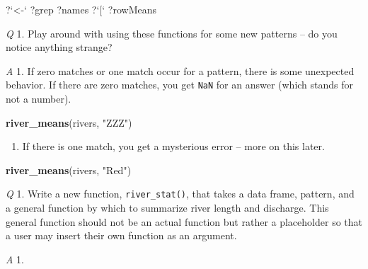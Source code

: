 \documentclass[
]{book}
\newenvironment{Shaded}{\begin{snugshade}}{\end{snugshade}}
\newcommand{\DataTypeTok}[1]{\textcolor[rgb]{0.13,0.29,0.53}{#1}}
\newcommand{\KeywordTok}[1]{\textcolor[rgb]{0.13,0.29,0.53}{\textbf{#1}}}
\newcommand{\NormalTok}[1]{#1}
\newcommand{\StringTok}[1]{\textcolor[rgb]{0.31,0.60,0.02}{#1}}
\providecommand{\tightlist}{%
  \setlength{\itemsep}{0pt}\setlength{\parskip}{0pt}}
\begin{document}
\begin{Shaded}
\begin{Highlighting}[]
\NormalTok{?}\StringTok{`}\DataTypeTok{<-}\StringTok{`}
\NormalTok{?grep}
\NormalTok{?names}
\NormalTok{?}\StringTok{`}\DataTypeTok{[}\StringTok{`}
\NormalTok{?rowMeans}
\end{Highlighting}
\end{Shaded}

\emph{Q} 1. Play around with using these functions for some new patterns -- do you notice anything strange?

\emph{A} 1. If zero matches or one match occur for a pattern, there is some unexpected behavior. If there are zero matches, you get \texttt{NaN} for an answer (which stands for not a number).

\begin{Shaded}
\begin{Highlighting}[]
\KeywordTok{river_means}\NormalTok{(rivers, }\StringTok{"ZZZ"}\NormalTok{)}
\end{Highlighting}
\end{Shaded}

\begin{enumerate}
\def\labelenumi{\arabic{enumi}.}
\setcounter{enumi}{1}
\tightlist
\item
  If there is one match, you get a mysterious error -- more on this later.
\end{enumerate}

\begin{Shaded}
\begin{Highlighting}[]
\KeywordTok{river_means}\NormalTok{(rivers, }\StringTok{"Red"}\NormalTok{)}
\end{Highlighting}
\end{Shaded}

\emph{Q} 1. Write a new function, \texttt{river\_stat()}, that takes a data frame, pattern, and a general function by which to summarize river length and discharge. This general function should not be an actual function but rather a placeholder so that a user may insert their own function as an argument.

\emph{A} 1.
\end{document}
